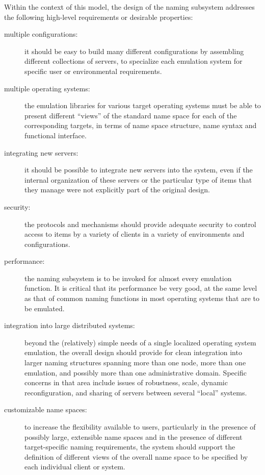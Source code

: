 Within the context of this model, the design of the naming subsystem
addresses the following high-level requirements or desirable
properties:
\begin{description}

\item[multiple configurations:] it should be easy to build many
different configurations by assembling different collections of
servers, to specialize each emulation system for specific user or
environmental requirements.

\item[multiple operating systems:] the emulation libraries for various
target operating systems must be able to present different ``views''
of the standard name space for each of the corresponding targets, in
terms of name space structure, name syntax and functional interface.

\item[integrating new servers:] it should be possible to integrate new
servers into the system, even if the internal organization of these
servers or the particular type of items that they manage were not
explicitly part of the original design.

\item[security:] the protocols and mechanisms should provide adequate
security to control access to items by a variety of clients in a
variety of environments and configurations.

\item[performance:] the naming subsystem is to be invoked for almost
every emulation function. It is critical that its performance be very
good, at the same level as that of common naming functions in most
operating systems that are to be emulated.

\item[integration into large distributed systems:] beyond the
(relatively) simple needs of a single localized operating system
emulation, the overall design should provide for clean integration
into larger naming structures spanning more than one node, more than
one emulation, and possibly more than one administrative domain.
Specific concerns in that area include issues of robustness, scale,
dynamic reconfiguration, and sharing of servers between several
``local'' systems.

\item[customizable name spaces:] to increase the flexibility
available to users, particularly in the presence of possibly large,
extensible name spaces and in the presence of different
target-specific naming requirements, the system should support the
definition of different views of the overall name space to be
specified by each individual client or system.

\end{description}

